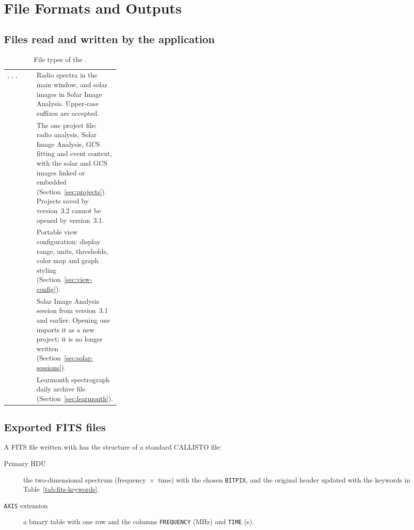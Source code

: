 \chapter{File Formats and Outputs}
\label{app:file-formats}

\section{Files read and written by the application}

\begin{table}[!htbp]
  \centering
  \caption{File types of the \appname{}.}
  \label{tab:file-types}
  \small
  \begin{tabularx}{\linewidth}{@{}P{0.27\linewidth}L@{}}
    \toprule
     &  \\
    \midrule
    , , ,  & Radio spectra in the main window, and solar images in Solar Image Analysis. Upper-case suffixes are accepted. \\
     & The one project file: radio analysis, Solar Image Analysis, GCS fitting and event context, with the solar and GCS images linked or embedded (Section~\ref{sec:projects}). Projects saved by version~3.2 cannot be opened by version~3.1. \\
     & Portable view configuration: display range, units, thresholds, color map and graph styling (Section~\ref{sec:view-config}). \\
     & Solar Image Analysis session from version~3.1 and earlier. Opening one imports it as a new project; it is no longer written (Section~\ref{sec:solar-sessions}). \\
     & Learmonth spectrograph daily archive file (Section~\ref{sec:learmonth}). \\
    \bottomrule
  \end{tabularx}
\end{table}

\section{Exported FITS files}
\label{sec:fits-structure}

A FITS file written with  has the structure of a
standard CALLISTO file:
\begin{description}
  \item[Primary HDU] the two-dimensional spectrum (frequency~\(\times\)~time) with the chosen
    \texttt{BITPIX}, and the original header updated with the keywords in
    Table~\ref{tab:fits-keywords}.
  \item[\texttt{AXIS} extension] a binary table with one row and the columns
    \texttt{FREQUENCY} (MHz) and \texttt{TIME} (s).
\end{description}

